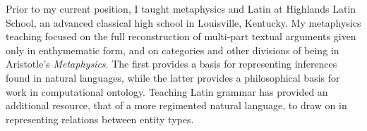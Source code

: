 Prior to my current position, I taught metaphysics and Latin at Highlands Latin School, an advanced classical high school in Louisville, Kentucky. My metaphysics teaching focused on the full reconstruction of multi-part textual arguments given only in enthymematic form, and on categories and other divisions of being in Aristotle's \emph{Metaphysics}. The first provides a basis for representing inferences found in natural languages, while the latter provides a philosophical basis for work in computational ontology. Teaching Latin grammar has provided an additional resource, that of a more regimented natural language, to draw on in representing relations between entity types.
